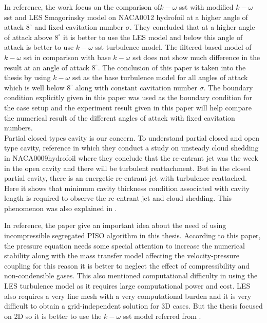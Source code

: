 In reference, \cite{Zhao2021} the work focus on the comparison of$k-\omega
$ sst with modified $k-\omega$ sst and LES Smagorinsky model on
NACA0012 hydrofoil at a higher angle of attack $8^{\circ}$ and fixed
cavitation number $\sigma$. They concluded that at a higher angle of
attack above $8^\circ$ it is better to use the LES model and
below this angle of attack is better to use $k-\omega$ sst turbulence
model. The filtered-based model of $k-\omega $ sst in comparison with
base $k-\omega$ sst does not show much difference in the result at an angle of attack $8^\circ$. The conclusion 
of this paper is taken into the thesis by using  $k-\omega$ sst as the base turbulence model for all
angles of attack which is well below $8^\circ$ along with constant
cavitation number $\sigma$. The boundary condition explicitly given in
this paper was used as the boundary condition for the case setup and
the experiment result given in this paper will help compare the numerical result of the different angles of attack with
fixed cavitation numbers.\\

Partial closed types cavity is our concern.
To understand partial closed and open type cavity, reference
\cite{ceccio2001} in which they conduct a study on unsteady cloud
shedding in NACA0009hydrofoil where they conclude that the re-entrant
jet was the week in the open cavity and there will be turbulent
reattachment. But in the closed partial cavity, there is an energetic
re-entrant jet with turbulence reattached. Here it shows that minimum
cavity thickness condition associated with cavity length is required
to observe the re-entrant jet and cloud shedding. This phenomenon was also explained in \cite{FundamentalsofCavitation.2004}. 

In  reference, \cite{Bensow2010} the paper give
an important idea about the need of using incompressible segregated
PISO algorithm in this thesis. According to this paper, the pressure
equation needs some special attention to increase the numerical
stability along with the mass transfer model affecting the
velocity-pressure coupling for this reason it is better to neglect the effect of
compressibility and non-condensible gases. This also mentioned computational
difficulty in using the LES turbulence model as it requires large
computational power and cost. LES also requires a very fine mesh with a
very computational burden and it is very difficult to obtain a
grid-independent solution \cite{ZHANG2017} for 3D cases. But the thesis
 focused on 2D so it is better to use the $k-\omega $  sst model
referred from \cite{Zhao2021}.  


